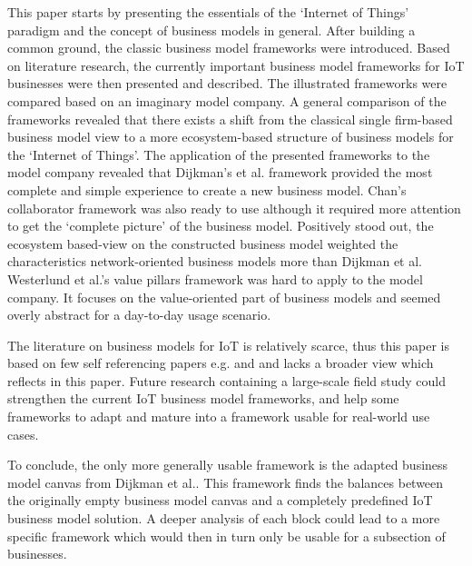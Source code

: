 	This paper starts by presenting the essentials of the `Internet of Things' paradigm and the concept of business models in general. After building a common ground, the classic business model frameworks were introduced. Based on literature research, the currently important business model frameworks for IoT businesses were then presented and described. The illustrated frameworks were compared based on an imaginary model company. A general comparison of the frameworks revealed that there exists a shift from the classical single firm-based business model view to a more ecosystem-based structure of business models for the `Internet of Things'. The application of the presented frameworks to the model company revealed that Dijkman's et al. framework provided the most complete and simple experience to create a new business model. Chan's collaborator framework was also ready to use although it required more attention to get the `complete picture' of the business model. Positively stood out, the ecosystem based-view on the constructed business model weighted the characteristics network-oriented business models more than Dijkman et al. Westerlund et al.'s value pillars framework was hard to apply to the model company. It focuses on the value-oriented part of business models and seemed overly abstract for a day-to-day usage scenario. 

	The literature on business models for IoT is relatively scarce, thus this paper is based on few self referencing papers e.g. \cite{ju} and \cite{dijkman} and lacks a broader view which reflects in this paper. Future research containing a large-scale field study could strengthen the current IoT business model frameworks, and help some frameworks to adapt and mature into a framework usable for real-world use cases.

	To conclude, the only more generally usable framework is the adapted business model canvas from Dijkman et al.. This framework finds the balances between the originally empty business model canvas and a completely predefined IoT business model solution. A deeper analysis of each block could lead to a more specific framework which would then in turn only be usable for a subsection of businesses.

